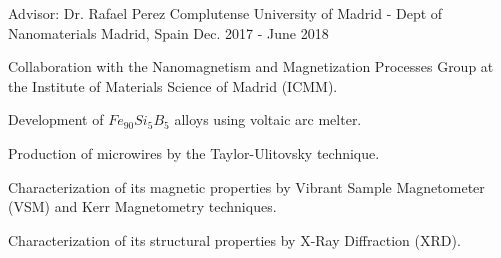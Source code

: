 \begin{cventries}
    \cventry
    {Advisor: Dr. Rafael Perez} %
    {Complutense University of Madrid - Dept of Nanomaterials} %
    {Madrid, Spain} %
    {Dec. 2017 - June 2018} %
    {
        \begin{cvitems} %
            \item {Collaboration with the Nanomagnetism and Magnetization Processes Group at the Institute of Materials Science of Madrid (ICMM).}
            \item {Development of $Fe_{90}Si_{5}B_5$ alloys using voltaic arc melter.}
            \item {Production of microwires by the Taylor-Ulitovsky technique.}
            \item {Characterization of its magnetic properties by Vibrant Sample Magnetometer (VSM) and Kerr Magnetometry techniques.}
            \item {Characterization of its structural properties by X-Ray Diffraction (XRD).}
        \end{cvitems}
    }
\end{cventries}
